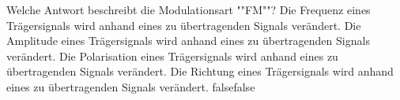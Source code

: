     {Welche Antwort beschreibt die Modulationsart ""FM""?}
    {Die Frequenz eines Trägersignals wird anhand eines zu übertragenden Signals verändert.}
    {Die Amplitude eines Trägersignals wird anhand eines zu übertragenden Signals verändert.}
    {Die Polarisation eines Trägersignals wird anhand eines zu übertragenden Signals verändert.}
    {Die Richtung eines Trägersignals wird anhand eines zu übertragenden Signals verändert.}
    {false}{false}